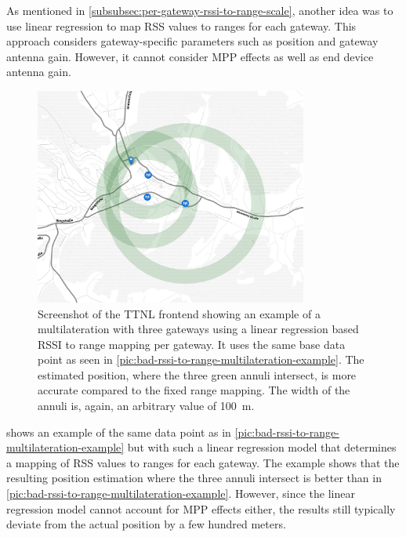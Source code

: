 As mentioned in \cref{subsubsec:per-gateway-rssi-to-range-scale}, another idea was to use linear regression to map \ac{RSS} values to ranges for each gateway.
This approach considers gateway-specific parameters such as position and gateway antenna gain.
However, it cannot consider \ac{MPP} effects as well as end device antenna gain.

\begin{figure}[htbp]
    \centering
    \includegraphics[width=0.8\textwidth]{pictures/ttn-locator/frontend/multilateration/rssi_range_multilateration_regression_example.png}
    \caption{
        Screenshot of the \ac{TTNL} frontend showing an example of a multilateration with three gateways using a linear regression based \ac{RSSI} to range mapping per gateway.
        It uses the same base data point as seen in \cref{pic:bad-rssi-to-range-multilateration-example}.
        The estimated position, where the three green annuli intersect, is more accurate compared to the fixed range mapping.
        The width of the annuli is, again, an arbitrary value of \SI{100}{\meter}.
    }\label{pic:rssi-to-range-multilateration-example-with-linear-regression}
\end{figure}

 shows an example of the same data point as in \cref{pic:bad-rssi-to-range-multilateration-example} but with such a linear regression model that determines a mapping of \ac{RSS} values to ranges for each gateway.
The example shows that the resulting position estimation where the three annuli intersect is better than in \cref{pic:bad-rssi-to-range-multilateration-example}.
However, since the linear regression model cannot account for \ac{MPP} effects either, the results still typically deviate from the actual position by a few hundred meters.

